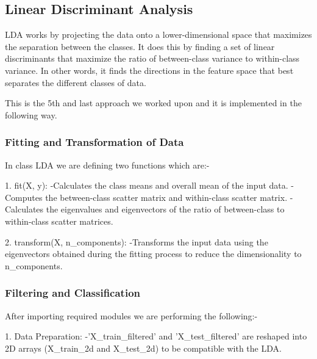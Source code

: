 \documentclass[a4paper]{article}
\theoremstyle{plain}
\theoremstyle{definition}
\begin{document}
        \subsection{Linear Discriminant Analysis}
	LDA works by projecting the data onto a lower-dimensional space that    maximizes the separation between the classes. It does this by finding a     set of linear discriminants that maximize the ratio of between-class variance to within-class variance. In other words, it finds the directions in the feature space that best separates the different classes of data.\bigskip
    
    This is the 5th and last approach we worked upon and it is implemented in the following way.

        \subsubsection{Fitting and Transformation of Data}
       In class LDA we are defining two functions which are:-\bigskip
      
       1. fit(X, y):\newline
       \hspace{10cm}-Calculates the class means and overall mean of the input data.\newline
      \hspace{10cm}-Computes the between-class scatter matrix and within-class scatter matrix.\newline
      \hspace{10cm}-Calculates the eigenvalues and eigenvectors of the ratio of between-class to within-class scatter matrices.\bigskip

      2. transform(X, n\_components):\newline
    \hspace{10cm}-Transforms the input data using the eigenvectors obtained during the fitting process to reduce the dimensionality to n\_components.

        \subsubsection{Filtering and Classification}
       After importing required modules we are performing the following:-\bigskip

        1. Data Preparation:\newline
       \hspace{10cm}-'X\_train\_filtered' and 'X\_test\_filtered' are reshaped into 2D arrays (X\_train\_2d and X\_test\_2d) to be compatible with the LDA.\newline
\end{document}
